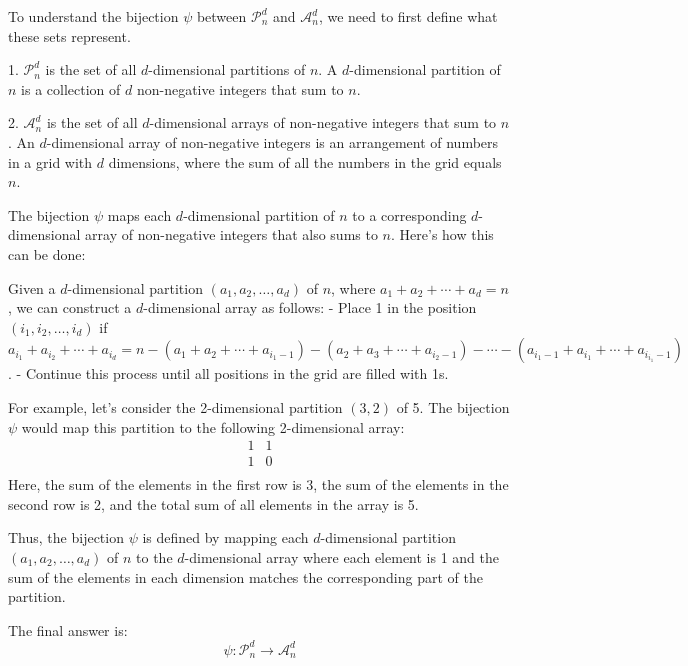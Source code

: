 To understand the bijection \(\psi\) between \(\mathcal{P}^d_n\) and \(\mathcal{A}^d_n\), we need to first define what these sets represent.

1. \(\mathcal{P}^d_n\) is the set of all \(d\)-dimensional partitions of \(n\). A \(d\)-dimensional partition of \(n\) is a collection of \(d\) non-negative integers that sum to \(n\).

2. \(\mathcal{A}^d_n\) is the set of all \(d\)-dimensional arrays of non-negative integers that sum to \(n\). An \(d\)-dimensional array of non-negative integers is an arrangement of numbers in a grid with \(d\) dimensions, where the sum of all the numbers in the grid equals \(n\).

The bijection \(\psi\) maps each \(d\)-dimensional partition of \(n\) to a corresponding \(d\)-dimensional array of non-negative integers that also sums to \(n\). Here's how this can be done:

Given a \(d\)-dimensional partition \((a_1, a_2, \ldots, a_d)\) of \(n\), where \(a_1 + a_2 + \cdots + a_d = n\), we can construct a \(d\)-dimensional array as follows:
- Place 1 in the position \((i_1, i_2, \ldots, i_d)\) if \(a_{i_1} + a_{i_2} + \cdots + a_{i_d} = n - (a_1 + a_2 + \cdots + a_{i_1-1}) - (a_2 + a_3 + \cdots + a_{i_2-1}) - \cdots - (a_{i_1-1} + a_{i_1} + \cdots + a_{i_{i_1}-1})\).
- Continue this process until all positions in the grid are filled with 1s.

For example, let's consider the 2-dimensional partition \((3, 2)\) of 5. The bijection \(\psi\) would map this partition to the following 2-dimensional array:
\[
\begin{array}{cc}
1 & 1 \\
1 & 0 \\
\end{array}
\]
Here, the sum of the elements in the first row is 3, the sum of the elements in the second row is 2, and the total sum of all elements in the array is 5.

Thus, the bijection \(\psi\) is defined by mapping each \(d\)-dimensional partition \((a_1, a_2, \ldots, a_d)\) of \(n\) to the \(d\)-dimensional array where each element is 1 and the sum of the elements in each dimension matches the corresponding part of the partition.

The final answer is:
\[
\boxed{\psi: \mathcal{P}^d_n \to \mathcal{A}^d_n}
\]